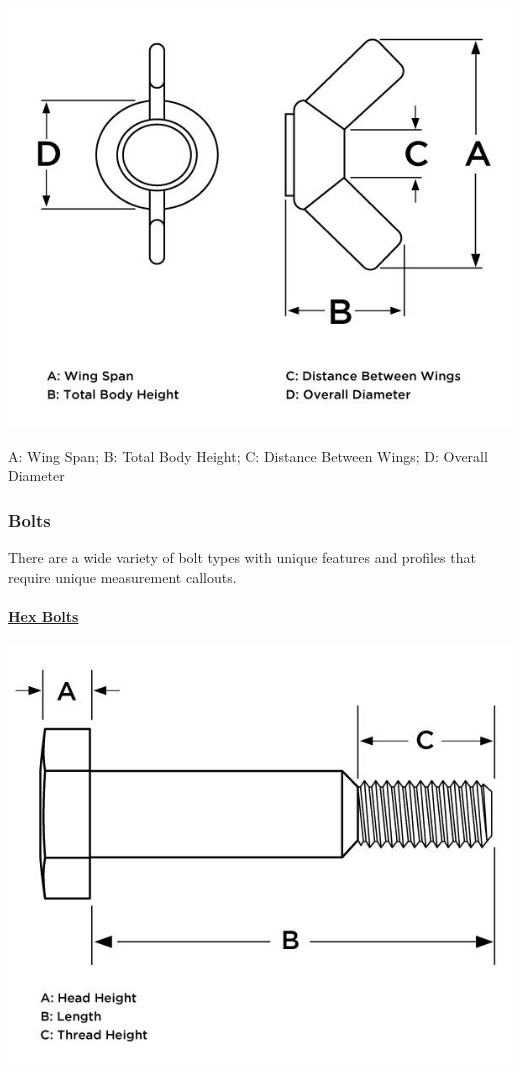 \documentclass[12pt, a4paper]{article}
\let\oldparagraph\paragraph
\renewcommand{\paragraph}[1]{\oldparagraph{#1}\mbox{}}
\begin{document}
		\includegraphics{Introduction to Nut and Bolt Sizes_files/6307bc42ebae7262807955.jpg}
		
		\hypertarget{ira03ji}{}
		A: Wing Span; B: Total Body Height; C: Distance Between Wings; D:
		Overall Diameter
		
		\hypertarget{iruib3g}{%
			\subsubsection{Bolts}\label{iruib3g}}
		
		\hypertarget{i921nmg}{}
		There are a wide variety of bolt types with unique features and profiles
		that require unique measurement callouts.
		
		\hypertarget{i45vs4o}{}
		\hypertarget{iygv1bu}{}
		\hypertarget{ikau5po}{%
			\paragraph{\texorpdfstring{\href{https://www.huyett.com/all-products/bolts/hex-bolts}{Hex
						Bolts}}{Hex Bolts}}\label{ikau5po}}
		
		\includegraphics{Introduction to Nut and Bolt Sizes_files/6307bd0a95270402904591.jpg}
		
\end{document}
